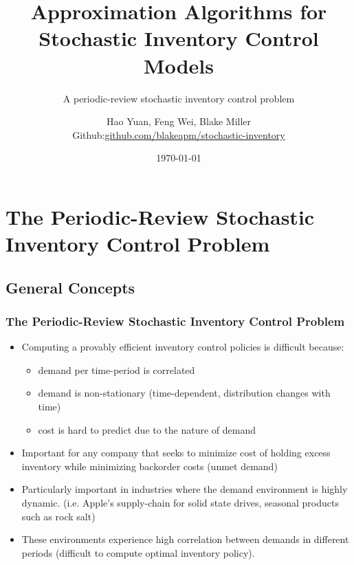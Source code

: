 \documentclass{beamer}
\title{Approximation Algorithms for Stochastic Inventory Control Models}
\subtitle{A periodic-review stochastic inventory control problem}
\author[Hao Yuan, Feng Wei, Blake Miller]{Hao Yuan, Feng Wei, Blake Miller \\ {\ttfamily Github:\href{https://github.com/blakeapm/stochastic-inventory}{github.com/blakeapm/stochastic-inventory}}}
\date{\today}
\begin{document}
  \frame{\titlepage}
  \section{The Periodic-Review Stochastic Inventory Control Problem}
  \subsection{General Concepts}
  \begin{frame}
    \frametitle{The Periodic-Review Stochastic Inventory Control Problem}
    \begin{itemize}
      \item Computing a provably efficient inventory control policies is difficult because:
        \begin{itemize}
          \item demand per time-period is correlated
          \item demand is non-stationary (time-dependent, distribution changes with time)
          \item cost is hard to predict due to the nature of demand
        \end{itemize}
      \item Important for any company that seeks to minimize cost of holding excess inventory while minimizing backorder costs (unmet demand)
      \item Particularly important in industries where the demand environment is highly dynamic. (i.e. Apple's supply-chain for solid state drives, seasonal products such as rock salt)
      \item These environments experience high correlation between demands in different periods (difficult to compute optimal inventory policy).
    \end{itemize}
  \end{frame}
\end{document}
